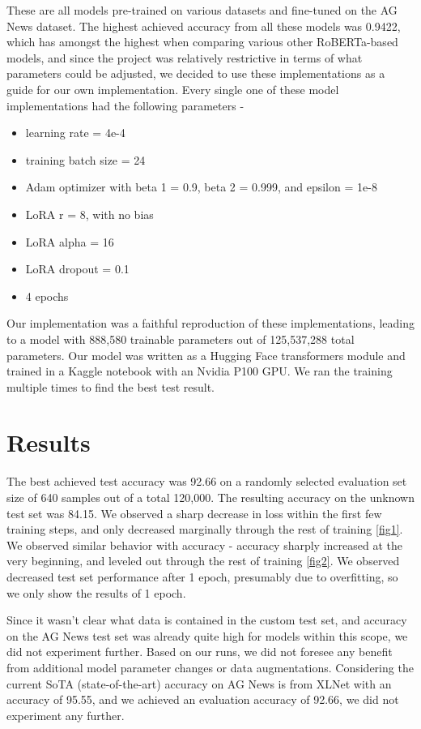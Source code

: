 \documentclass[letterpaper]{article} %
\begin{document}
These are all models pre-trained on various datasets and fine-tuned on the AG News dataset.  The highest achieved accuracy from all these models was 0.9422, which has amongst the highest when comparing various other RoBERTa-based models, and since the project was relatively restrictive in terms of what parameters could be adjusted, we decided to use these implementations as a guide for our own implementation.  Every single one of these model implementations had the following parameters -

\begin{itemize}
    \item learning rate = 4e-4
    \item training batch size = 24
    \item Adam optimizer with beta 1 = 0.9, beta 2 = 0.999, and epsilon = 1e-8
    \item LoRA r = 8, with no bias
    \item LoRA alpha = 16
    \item LoRA dropout = 0.1
    \item 4 epochs
\end{itemize}

Our implementation was a faithful reproduction of these implementations, leading to a model with 888,580 trainable parameters out of 125,537,288 total parameters.  Our model was written as a Hugging Face transformers module and trained in a Kaggle notebook with an Nvidia P100 GPU.  We ran the training multiple times to find the best test result.

\section{Results}

The best achieved test accuracy was 92.66 on a randomly selected evaluation set size of 640 samples out of a total 120,000.  The resulting accuracy on the unknown test set was 84.15.  We observed a sharp decrease in loss within the first few training steps, and only decreased marginally through the rest of training \ref{fig1}.  We observed similar behavior with accuracy - accuracy sharply increased at the very beginning, and leveled out through the rest of training \ref{fig2}.  We observed decreased test set performance after 1 epoch, presumably due to overfitting, so we only show the results of 1 epoch.

Since it wasn't clear what data is contained in the custom test set, and accuracy on the AG News test set was already quite high for models within this scope, we did not experiment further.  Based on our runs, we did not foresee any benefit from additional model parameter changes or data augmentations.  Considering the current SoTA (state-of-the-art) accuracy on AG News is from XLNet \cite{yang2020xlnetgeneralizedautoregressivepretraining} with an accuracy of 95.55, and we achieved an evaluation accuracy of 92.66, we did not experiment any further.
\end{document}
